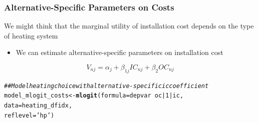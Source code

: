 \documentclass{beamer}\usepackage[]{graphicx}\usepackage[]{color}
\makeatletter
\newcommand{\hlnum}[1]{\textcolor[rgb]{0.686,0.059,0.569}{#1}}%
\newcommand{\hlstr}[1]{\textcolor[rgb]{0.192,0.494,0.8}{#1}}%
\newcommand{\hlcom}[1]{\textcolor[rgb]{0.678,0.584,0.686}{\textit{#1}}}%
\newcommand{\hlopt}[1]{\textcolor[rgb]{0,0,0}{#1}}%
\newcommand{\hlstd}[1]{\textcolor[rgb]{0.345,0.345,0.345}{#1}}%
\newcommand{\hlkwb}[1]{\textcolor[rgb]{0.69,0.353,0.396}{#1}}%
\newcommand{\hlkwc}[1]{\textcolor[rgb]{0.333,0.667,0.333}{#1}}%
\newcommand{\hlkwd}[1]{\textcolor[rgb]{0.737,0.353,0.396}{\textbf{#1}}}%
\newenvironment{kframe}{%
 \def\at@end@of@kframe{}%
 \ifinner\ifhmode%
  \def\at@end@of@kframe{\end{minipage}}%
  \begin{minipage}{\columnwidth}%
 \fi\fi%
 \def\FrameCommand##1{\hskip\@totalleftmargin \hskip-\fboxsep
 \colorbox{shadecolor}{##1}\hskip-\fboxsep
     \hskip-\linewidth \hskip-\@totalleftmargin \hskip\columnwidth}%
 \MakeFramed {\advance\hsize-\width
   \@totalleftmargin\z@ \linewidth\hsize
   \@setminipage}}%
 {\par\unskip\endMakeFramed%
 \at@end@of@kframe}
\newenvironment{knitrout}{}{} %
\makeatother
\begin{document}
\begin{frame}[fragile]\frametitle{Alternative-Specific Parameters on Costs}
	We might think that the marginal utility of installation cost depends on the type of heating system
	\begin{itemize}
		\item We can estimate alternative-specific parameters on installation cost
	\end{itemize}
	$$V_{nj} = \alpha_j + \beta_{1j} IC_{nj} + \beta_2 OC_{nj}$$
\begin{knitrout}\footnotesize
{}\color{fgcolor}\begin{kframe}
\begin{alltt}
\hlcom{## Model heating choice with alternative-specific ic coefficient}
\hlstd{model_mlogit_costs} \hlkwb{<-} \hlkwd{mlogit}\hlstd{(}\hlkwc{formula} \hlstd{= depvar} \hlopt{~} \hlstd{oc} \hlopt{|} \hlnum{1} \hlopt{|} \hlstd{ic,}
                             \hlkwc{data} \hlstd{= heating_dfidx,}
                             \hlkwc{reflevel} \hlstd{=} \hlstr{'hp'}\hlstd{)}
\end{alltt}
\end{kframe}
\end{knitrout}
\end{frame}
\end{document}
